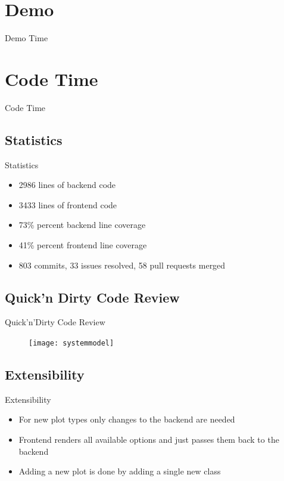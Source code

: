 \documentclass{beamer}
\begin{document}
\section{Demo}
\begin{frame}
  \begin{center}
    \Huge{Demo Time}
  \end{center}
\end{frame}

\section{Code Time}
\begin{frame}
  \begin{center}
    \Huge{Code Time}
  \end{center}
\end{frame}

\subsection{Statistics}
\begin{frame}{Statistics}
  \begin{itemize}
      \item 2986 lines of backend code
      \item 3433 lines of frontend code
      \item 73\% percent backend line coverage
      \item 41\% percent frontend line coverage
      \item 803 commits, 33 issues resolved, 58 pull requests merged
  \end{itemize}
\end{frame}

\subsection{Quick'n Dirty Code Review}
\begin{frame}{Quick'n'Dirty Code Review}
  \begin{center}
    \begin{figure}
      \centering
      \texttt{[image: systemmodel]}
    \end{figure}
  \end{center}
\end{frame}

\subsection{Extensibility}
\begin{frame}{Extensibility}
  \begin{itemize}
    \item For new plot types only changes to the backend are needed
    \item Frontend renders all available options and just passes them back to the backend
    \item Adding a new plot is done by adding a single new class
  \end{itemize}
\end{frame}
\end{document}
